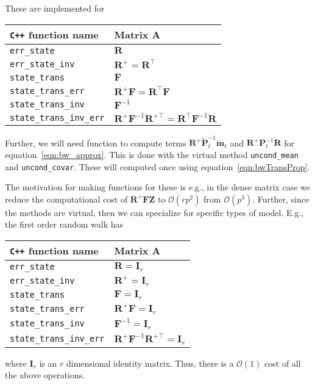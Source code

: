 \documentclass[9pt, notitlepage]{article}
\renewcommand{\vec}[1]{\bm{#1}}
\newcommand{\vecLarrow}[1]{\overleftarrow{\vec{#1}}}
\newcommand{\mat}[1]{\mathbf{#1}}
\newcommand{\matLarrow}[1]{\overleftarrow{\mat{#1}}}
\newcommand{\Lparen}[1]{\left( #1\right)}
\newcommand{\bigO}[1]{\mathcal{O}\Lparen{#1}}
\newcommand{\dimState}{p}
\newcommand{\dimRng}{r}
\begin{document}
These are implemented for %
%
\begin{center}
\begin{tabular}{ l l } 
 \verb|C++| function name & Matrix $\mat{A}$ \\
 \hline
 \verb|err_state|           & $\mat{R}$ \\
 \verb|err_state_inv|       & $\mat{R}^{+} = \mat{R}^\top$ \\
 \verb|state_trans|         & $\mat{F}$ \\
 \verb|state_trans_err|     & $\mat{R}^{+}\mat{F} = \mat{R}^\top\mat{F}$ \\
 \verb|state_trans_inv|     & $\mat{F}^{-1}$ \\
 \verb|state_trans_inv_err| & $\mat{R}^{+}\mat{F}^{-1}\mat{R}^{+\top} = 
  \mat{R}^\top\mat{F}^{-1}\mat{R}$
\end{tabular}
\end{center}

Further, we will need function to compute terms $\mat{R}^{+}\matLarrow{P}_t^{-1}\vecLarrow{m}_t$ and $\mat{R}^{+}\mat{P}_t^{-1}\mat{R}$ for equation~\eqref{eqn:bw_approx}. This is done with the virtual method \verb|uncond_mean| and \verb|uncond_covar|. These will computed once using equation~\eqref{eqn:bwTransProp}. 

The motivation for making functions for these is e.g., in the dense matrix case we reduce the computational cost of $\mat{R}^{+}\mat{F}\mat{Z}$ to $\bigO{\dimRng\dimState^2}$ from $\bigO{\dimState^3}$. Further, since the methods are virtual, then we can specialize for specific types of model. E.g., the first order random walk has%
%
\begin{center}
\begin{tabular}{ l l } 
 \verb|C++| function name & Matrix $\mat{A}$ \\
 \hline
 \verb|err_state|           & $\mat{R} = \mat{I}_\dimRng$ \\
 \verb|err_state_inv|       & $\mat{R}^{+} = \mat{I}_\dimRng$ \\
 \verb|state_trans|         & $\mat{F} = \mat{I}_\dimRng$ \\
 \verb|state_trans_err|     & $\mat{R}^{+}\mat{F} = \mat{I}_\dimRng$ \\
 \verb|state_trans_inv|     & $\mat{F}^{-1} = \mat{I}_\dimRng$ \\
 \verb|state_trans_inv_err| & $\mat{R}^{+}\mat{F}^{-1}\mat{R}^{+\top}  = \mat{I}_\dimRng$
\end{tabular}
\end{center}%
% 
where $\mat{I}_\dimRng$ is an $r$ dimensional identity matrix. Thus, there is a $\bigO{1}$ cost of all the above operations. 





\newpage


\end{document}
